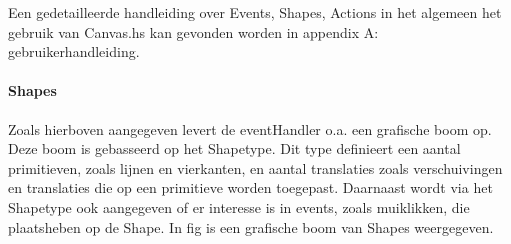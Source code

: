 Een gedetailleerde handleiding over Events, Shapes, Actions in het algemeen het gebruik van Canvas.hs kan gevonden worden in appendix A: gebruikerhandleiding. 

\paragraph{Shapes}
Zoals hierboven aangegeven levert de eventHandler o.a. een grafische boom op. Deze boom is gebasseerd op het Shapetype. Dit type definieert een aantal primitieven, zoals lijnen en vierkanten, en aantal translaties zoals verschuivingen en translaties die op een primitieve worden toegepast. Daarnaast wordt via het Shapetype ook aangegeven of er interesse is in events, zoals muiklikken, die plaatsheben op de Shape. In fig is een grafische boom van Shapes weergegeven. 


